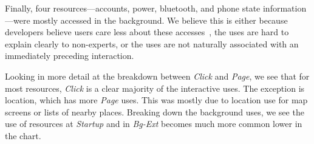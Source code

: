 Finally, four resources---accounts, power, bluetooth, and phone state
information---were mostly accessed in the background. We believe this
is either because developers believe users care less about these
accesses~\cite{Felt:2012spsm}, the uses are hard to explain
clearly to non-experts, or the uses are not naturally associated with
an immediately preceding interaction. 


Looking in more detail at the breakdown between \emph{Click} and
\emph{Page}, we see that for most resources, \emph{Click} is a clear
majority of the interactive uses. The exception is location, which has
more \emph{Page} uses. This was mostly due to location use for
map screens or lists of nearby places. Breaking down
the background uses, we see the use of resources at \emph{Startup} and
in \emph{Bg-Ext} becomes much more common lower in the
chart.


